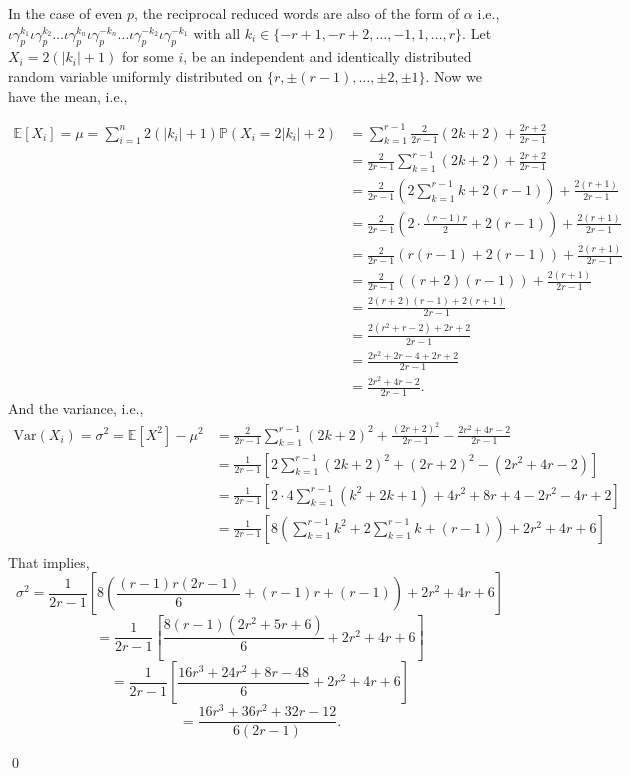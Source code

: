 \documentclass[11pt]{amsart}
\renewenvironment{proof}{{\bfseries Proof.}}{\qed}
\numberwithin{equation}{section}
\newcommand{\g}{\gamma_{p}}
\newcommand{\io}{\iota }
\numberwithin{equation}{section}
\begin{document}
		\begin{proof}
			In the case of even $p$, the reciprocal reduced words are also of the form of $\alpha$ i.e., $ \io\g^{k_{1}}\io \g^{k_{2}}\dots \io \g^{k_{n}}\io \g^{-k_{n}}\dots\io \g^{-k_{2}}\io \g^{-k_{1}} $ with all $k_{i}\in \{-r+1,-r+2,\dots,-1,1,\dots,r\}.$ 
			Let $X_{i}=2\left(\left|k_{i}\right|+1\right)$  for some $i$, be an independent and identically distributed random variable uniformly distributed on $\{r,\pm (r-1),\dots, \pm2,\pm 1\}$.  Now we have the mean, i.e.,
		
			\begin{align*}
				\mathbb{E}[X_i] = \mu = \sum_{i=1}^{n}2(\left|k_{i}\right|+1)\mathbb{P}(X_{i}=2\left|k_{i}\right|+2)
			   &=	\sum_{k=1}^{r-1} \frac{2}{2r-1}(2k + 2) + \frac{2r + 2}{2r - 1}\\[6pt]
				&= \frac{2}{2r - 1} \sum_{k=1}^{r-1}(2k + 2) + \frac{2r + 2}{2r - 1} \\[6pt]
			&= \frac{2}{2r - 1} \left(2\sum_{k=1}^{r-1}k + 2(r - 1)\right) + \frac{2(r + 1)}{2r - 1} \\[6pt]
				&= \frac{2}{2r - 1} \left(2 \cdot \frac{(r-1)r}{2} + 2(r - 1)\right) + \frac{2(r + 1)}{2r - 1} \\[6pt]
				&= \frac{2}{2r - 1} \left(r(r - 1) + 2(r - 1)\right) + \frac{2(r + 1)}{2r - 1} \\[6pt]
				&= \frac{2}{2r - 1} \left((r + 2)(r - 1)\right) + \frac{2(r + 1)}{2r - 1} \\[6pt]
				&= \frac{2(r + 2)(r - 1) + 2(r + 1)}{2r - 1} \\[6pt]
				&= \frac{2(r^2 + r - 2) + 2r + 2}{2r - 1} \\[6pt]
				&= \frac{2r^2 + 2r - 4 + 2r + 2}{2r - 1} \\[6pt]
				&= \frac{2r^2 + 4r - 2}{2r - 1}.
 			\end{align*}
			And the variance, i.e.,
			\begin{align*}
					\mathrm{Var}(X_i) = \sigma^2 = \mathbb{E}[X^{2}]-\mu^{2}
				&= \frac{2}{2r-1}\sum_{k=1}^{r-1} (2k+2)^2+\frac{(2r + 2)^2}{2r - 1} - \frac{2r^2 + 4r - 2}{2r - 1} \\[6pt]
	           &= \frac{1}{2r - 1} \left[ 2\sum_{k=1}^{r-1}(2k + 2)^2 + (2r + 2)^2 - (2r^2 + 4r - 2) \right] \\[6pt]
				&= \frac{1}{2r - 1} \left[ 2\cdot 4\sum_{k=1}^{r-1}(k^2 + 2k + 1) + 4r^2 + 8r + 4 - 2r^2 - 4r + 2 \right] \\[6pt]
				&= \frac{1}{2r - 1} \left[ 8 \left( \sum_{k=1}^{r-1}k^2 + 2\sum_{k=1}^{r-1}k + (r - 1) \right) + 2r^2 + 4r + 6 \right] \\[6pt]
                \end{align*}
              That implies,  
                 \[ \sigma^2 = \frac{1}{2r - 1} \left[ 8\left( \frac{(r - 1)r(2r - 1)}{6} + (r - 1)r + (r - 1) \right) + 2r^2 + 4r + 6 \right] \]
				\[= \frac{1}{2r - 1} \left[ \frac{8(r - 1)(2r^2 + 5r + 6)}{6} + 2r^2 + 4r + 6 \right]\] 
				\[= \frac{1}{2r - 1} \left[ \frac{16r^3 + 24r^2 + 8r - 48}{6} + 2r^2 + 4r + 6 \right]\] 
				\[= {\frac{16r^3 + 36r^2 + 32r - 12}{6(2r - 1)}}.\]
			

\end{proof}
\end{document}
